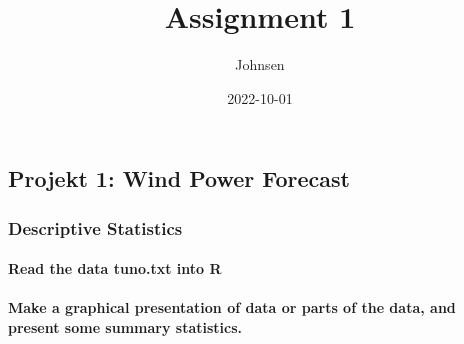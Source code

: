 \documentclass[
]{article}
\title{Assignment 1}
\author{Johnsen}
\date{2022-10-01}
\newenvironment{Shaded}{\begin{snugshade}}{\end{snugshade}}
\newcommand{\AttributeTok}[1]{\textcolor[rgb]{0.77,0.63,0.00}{#1}}
\newcommand{\ConstantTok}[1]{\textcolor[rgb]{0.00,0.00,0.00}{#1}}
\newcommand{\DecValTok}[1]{\textcolor[rgb]{0.00,0.00,0.81}{#1}}
\newcommand{\FunctionTok}[1]{\textcolor[rgb]{0.00,0.00,0.00}{#1}}
\newcommand{\NormalTok}[1]{#1}
\newcommand{\OtherTok}[1]{\textcolor[rgb]{0.56,0.35,0.01}{#1}}
\newcommand{\SpecialCharTok}[1]{\textcolor[rgb]{0.00,0.00,0.00}{#1}}
\newcommand{\StringTok}[1]{\textcolor[rgb]{0.31,0.60,0.02}{#1}}
\begin{document}
\maketitle

\hypertarget{projekt-1-wind-power-forecast}{%
\subsection{Projekt 1: Wind Power
Forecast}\label{projekt-1-wind-power-forecast}}

\hypertarget{descriptive-statistics}{%
\subsubsection{Descriptive Statistics}\label{descriptive-statistics}}

\hypertarget{read-the-data-tuno.txt-into-r}{%
\paragraph{Read the data tuno.txt into
R}\label{read-the-data-tuno.txt-into-r}}

\begin{Shaded}
\end{Shaded}

\hypertarget{make-a-graphical-presentation-of-data-or-parts-of-the-data-and-present-some-summary-statistics.}{%
\paragraph{Make a graphical presentation of data or parts of the data,
and present some summary
statistics.}\label{make-a-graphical-presentation-of-data-or-parts-of-the-data-and-present-some-summary-statistics.}}
\end{document}
